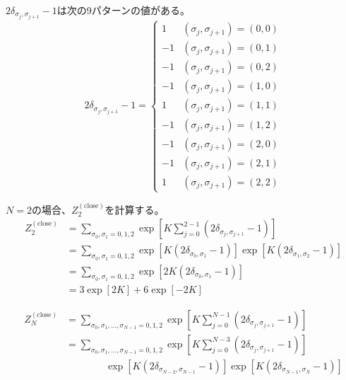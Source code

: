 \documentclass[12pt,b5paper]{ltjsarticle}
\begin{document}
\begin{enumerate}
      \dotfill

      $2\delta_{\sigma_{j},\sigma_{j+1}}-1$は次の9パターンの値がある。
      \begin{equation}
       2\delta_{\sigma_{j},\sigma_{j+1}}-1
        =
        \begin{cases}
         1 & (\sigma_{j},\sigma_{j+1})=(0,0)\\
         -1 & (\sigma_{j},\sigma_{j+1})=(0,1)\\
         -1 & (\sigma_{j},\sigma_{j+1})=(0,2)\\
         -1 & (\sigma_{j},\sigma_{j+1})=(1,0)\\
         1 & (\sigma_{j},\sigma_{j+1})=(1,1)\\
         -1 & (\sigma_{j},\sigma_{j+1})=(1,2)\\
         -1 & (\sigma_{j},\sigma_{j+1})=(2,0)\\
         -1 & (\sigma_{j},\sigma_{j+1})=(2,1)\\
         1 & (\sigma_{j},\sigma_{j+1})=(2,2)
        \end{cases}
      \end{equation}

      $N=2$の場合、$Z^{(\mathrm{close})}_{2}$を計算する。
      \begin{align}
       Z^{(\mathrm{close})}_{2}
        &= \sum_{\sigma_{0},\sigma_{1} = 0,1,2}
        \exp \left[
              K \sum_{j=0}^{2-1} (2\delta_{\sigma_{j},\sigma_{j+1}}-1)
             \right]\\
        &= \sum_{\sigma_{0},\sigma_{1} = 0,1,2}
        \exp \left[
              K (2\delta_{\sigma_{0},\sigma_{1}}-1)
             \right]
        \exp \left[
              K (2\delta_{\sigma_{1},\sigma_{2}}-1)
             \right]\\
        &= \sum_{\sigma_{0},\sigma_{1} = 0,1,2}
        \exp \left[
              2K (2\delta_{\sigma_{0},\sigma_{1}}-1)
             \right]\\
        &= 
        3\exp \left[ 2K \right]
        + 6\exp \left[ -2K \right]
      \end{align}

      \begin{align}
       Z^{(\mathrm{close})}_{N} &=
        \sum_{\sigma_{0},\sigma_{1},\dots,\sigma_{N-1} = 0,1,2}
        \exp \left[
              K \sum_{j=0}^{N-1} (2\delta_{\sigma_{j},\sigma_{j+1}}-1)
             \right]\\
       &= \sum_{\sigma_{0},\sigma_{1},\dots,\sigma_{N-1} = 0,1,2}
             \exp \left[
              K \sum_{j=0}^{N-3} (2\delta_{\sigma_{j},\sigma_{j+1}}-1)
             \right]\nonumber\\
           &\qquad\qquad  \exp \left[
              K (2\delta_{\sigma_{N-2},\sigma_{N-1}}-1)
             \right]
             \exp \left[
              K (2\delta_{\sigma_{N-1},\sigma_{N}}-1)
             \right]\\
      \end{align}








      \hrulefill

\end{enumerate}

\hrulefill
\end{document}
